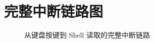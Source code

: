 \section{完整中断链路图}

\begin{figure}[H]
  \centering
  
  \caption{从键盘按键到 Shell 读取的完整中断链路}
\end{figure}


